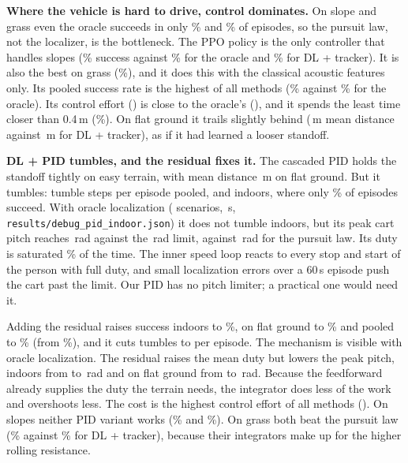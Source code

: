 \textbf{Where the vehicle is hard to drive, control dominates.} On slope and grass even the
oracle succeeds in only \CLAusoraclesuccslope\% and \CLAusoraclesuccgrass\% of episodes, so the
pursuit law, not the localizer, is the bottleneck. The PPO policy is the only controller that
handles slopes (\CLAusrlsuccslope\% success against \CLAusoraclesuccslope\% for the oracle and
\CLAusdltracksuccslope\% for DL + tracker). It is also the best on grass
(\CLAusrlsuccgrass\%), and it does this with the classical acoustic features only. Its pooled
success rate is the highest of all methods (\CLAusrlsucc\% against \CLAusoraclesucc\% for the
oracle). Its control effort (\CLAusrleffort) is close to the oracle's (\CLAusoracleeffort),
and it spends the least time closer than 0.4\,m (\CLAusrlclose\%). On flat ground it trails slightly behind
(\CLAusrldistflat\,m mean distance against \CLAusdltrackdistflat\,m for DL + tracker), as if it
had learned a looser standoff.

\textbf{DL + PID tumbles, and the residual fixes it.} The cascaded PID holds the standoff
tightly on easy terrain, with mean distance \CLAusdlpiddistflat\,m on flat ground. But it
tumbles: \CLAusdlpidtumbles{} tumble steps per episode pooled, and \CLAusdlpidtumblesindoor{}
indoors, where only \CLAusdlpidsuccindoor\% of episodes succeed. With oracle localization
(\DbgN{} scenarios, \DbgSeconds\,s, \texttt{results/debug\_pid\_indoor.json}) it does not
tumble indoors, but its peak cart pitch reaches \DbgOraclePidindoorPitch\,rad against the
\PitchLimit\,rad limit, against \DbgOraclePursuitindoorPitch\,rad for the pursuit law. Its
duty is saturated \DbgOraclePidindoorSat\% of the time. The inner speed loop
reacts to every stop and start of the person with full duty, and small localization errors over
a 60\,s episode push the cart past the limit. Our PID has no pitch limiter; a practical one
would need it.

Adding the residual raises success indoors to \CLAusdlpidressuccindoor\%, on flat ground to
\CLAusdlpidressuccflat\% and pooled to \CLAusdlpidressucc\% (from \CLAusdlpidsucc\%), and it
cuts tumbles to \CLAusdlpidrestumbles{} per episode. The mechanism is visible with oracle
localization. The residual raises the mean duty but lowers the peak pitch, indoors from
\DbgOraclePidindoorPitch{} to \DbgOraclePidResindoorPitch\,rad and on flat ground from
\DbgOraclePidflatPitch{} to \DbgOraclePidResflatPitch\,rad. Because the feedforward already
supplies the duty the terrain needs, the integrator does less of the work and overshoots less.
The cost is the highest control effort of all methods (\CLAusdlpidreseffort). On slopes neither
PID variant works (\CLAusdlpidsuccslope\% and \CLAusdlpidressuccslope\%). On grass both beat the
pursuit law (\CLAusdlpidsuccgrass\% against \CLAusdltracksuccgrass\% for DL + tracker), because
their integrators make up for the higher rolling resistance.

